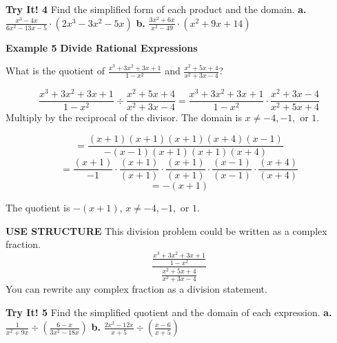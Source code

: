 \documentclass{article}
\newenvironment{example}[1]{\textbf{Example #1}}{\vspace{1em}}
\newenvironment{tryit}[1]{\textbf{Try It! #1}}{\vspace{1em}}
\newcommand{\answer}[1]{}
\begin{document}
\begin{tryit}{4}
Find the simplified form of each product and the domain.
\textbf{a.} $\frac{x^3-4x}{6x^2-13x-5} \cdot (2x^3 - 3x^2 - 5x)$ \qquad
\textbf{b.} $\frac{3x^2+6x}{x^2-49} \cdot (x^2+9x+14)$
\answer{}
\end{tryit}

\begin{example}{5}
\textbf{Divide Rational Expressions}

What is the quotient of $\frac{x^3+3x^2+3x+1}{1-x^2}$ and $\frac{x^2+5x+4}{x^2+3x-4}$?

$$ \frac{x^3+3x^2+3x+1}{1-x^2} \div \frac{x^2+5x+4}{x^2+3x-4} = \frac{x^3+3x^2+3x+1}{1-x^2} \cdot \frac{x^2+3x-4}{x^2+5x+4} $$
Multiply by the reciprocal of the divisor. The domain is $x \neq -4, -1, \text{ or } 1$.

$$ = \frac{(x+1)(x+1)(x+1)(x+4)(x-1)}{-(x-1)(x+1)(x+1)(x+4)} $$
$$ = \frac{(x+1)}{-1} \cdot \frac{(x+1)}{(x+1)} \cdot \frac{(x+1)}{(x+1)} \cdot \frac{(x-1)}{(x-1)} \cdot \frac{(x+4)}{(x+4)} $$
$$ = -(x+1) $$

The quotient is $-(x+1)$, $x \neq -4, -1, \text{ or } 1$.

\textbf{USE STRUCTURE}
This division problem could be written as a complex fraction.
$$ \frac{\frac{x^3+3x^2+3x+1}{1-x^2}}{\frac{x^2+5x+4}{x^2+3x-4}} $$
You can rewrite any complex fraction as a division statement.
\end{example}

\begin{tryit}{5}
Find the simplified quotient and the domain of each expression.
\textbf{a.} $\frac{1}{x^2+9x} \div \left( \frac{6-x}{3x^2-18x} \right)$ \qquad
\textbf{b.} $\frac{2x^2-12x}{x+5} \div \left( \frac{x-6}{x+5} \right)$
\answer{}
\end{tryit}
\end{document}
